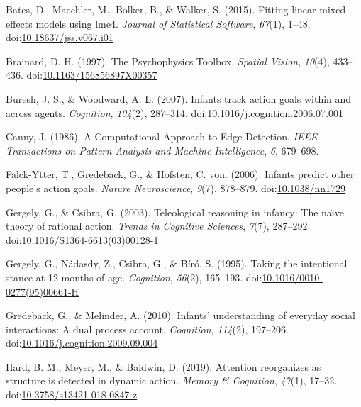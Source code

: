 \documentclass[
  english,
  man,floatsintext]{apa6}
\newlength{\cslhangindent}
\newenvironment{cslreferences}%
  {\setlength{\parindent}{0pt}%
  \everypar{\setlength{\hangindent}{\cslhangindent}}\ignorespaces}%
  {\par}
\begin{document}
\begin{cslreferences}
\leavevmode\hypertarget{ref-bates_2015}{}%
Bates, D., Maechler, M., Bolker, B., \& Walker, S. (2015). Fitting linear mixed effects models using lme4. \emph{Journal of Statistical Software}, \emph{67}(1), 1--48. doi:\href{https://doi.org/10.18637/jss.v067.i01}{10.18637/jss.v067.i01}

\leavevmode\hypertarget{ref-brainard_1997}{}%
Brainard, D. H. (1997). The Psychophysics Toolbox. \emph{Spatial Vision}, \emph{10}(4), 433--436. doi:\href{https://doi.org/10.1163/156856897X00357}{10.1163/156856897X00357}

\leavevmode\hypertarget{ref-buresh_woodward_2007}{}%
Buresh, J. S., \& Woodward, A. L. (2007). Infants track action goals within and across agents. \emph{Cognition}, \emph{104}(2), 287--314. doi:\href{https://doi.org/10.1016/j.cognition.2006.07.001}{10.1016/j.cognition.2006.07.001}

\leavevmode\hypertarget{ref-canny_1986}{}%
Canny, J. (1986). A Computational Approach to Edge Detection. \emph{IEEE Transactions on Pattern Analysis and Machine Intelligence}, \emph{6}, 679--698.

\leavevmode\hypertarget{ref-falckytter_2006}{}%
Falck-Ytter, T., Gredebäck, G., \& Hofsten, C. von. (2006). Infants predict other people's action goals. \emph{Nature Neuroscience}, \emph{9}(7), 878--879. doi:\href{https://doi.org/10.1038/nn1729}{10.1038/nn1729}

\leavevmode\hypertarget{ref-gergely_csibra_2003}{}%
Gergely, G., \& Csibra, G. (2003). Teleological reasoning in infancy: The naı̈ve theory of rational action. \emph{Trends in Cognitive Sciences}, \emph{7}(7), 287--292. doi:\href{https://doi.org/10.1016/S1364-6613(03)00128-1}{10.1016/S1364-6613(03)00128-1}

\leavevmode\hypertarget{ref-gergely_1995}{}%
Gergely, G., Nádasdy, Z., Csibra, G., \& Bíró, S. (1995). Taking the intentional stance at 12 months of age. \emph{Cognition}, \emph{56}(2), 165--193. doi:\href{https://doi.org/10.1016/0010-0277(95)00661-H}{10.1016/0010-0277(95)00661-H}

\leavevmode\hypertarget{ref-gredeback_melinder_2010}{}%
Gredebäck, G., \& Melinder, A. (2010). Infants' understanding of everyday social interactions: A dual process account. \emph{Cognition}, \emph{114}(2), 197--206. doi:\href{https://doi.org/10.1016/j.cognition.2009.09.004}{10.1016/j.cognition.2009.09.004}

\leavevmode\hypertarget{ref-hard_2018}{}%
Hard, B. M., Meyer, M., \& Baldwin, D. (2019). Attention reorganizes as structure is detected in dynamic action. \emph{Memory \& Cognition}, \emph{47}(1), 17--32. doi:\href{https://doi.org/10.3758/s13421-018-0847-z}{10.3758/s13421-018-0847-z}


\end{cslreferences}
\end{document}

